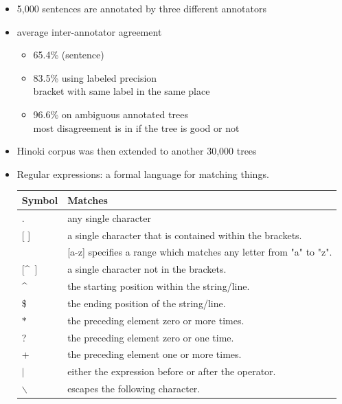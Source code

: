 \documentclass[a4paper,landscape,headrule,footrule,xetex]{foils}
\begin{document}
\begin{itemize}
\item  5,000 sentences are annotated by three different annotators
\item  average inter-annotator agreement
  \begin{itemize}
  \item 65.4\% (sentence)
  \item 83.5\% using labeled precision
    \\ bracket with same label in the same place
  \item 96.6\% on ambiguous annotated trees 
    \\ most disagreement is in if the tree is good or not
  \end{itemize}
\item Hinoki corpus was then extended to another 30,000 trees
\end{itemize}





\begin{itemize}
\item Regular expressions: a formal language for matching things.
\\[2ex]
  \begin{tabular}{ll}
    Symbol & Matches \\ \hline
    . & any single character\\
    {[ ]} & a single character that is contained within the brackets. \\
    & {[a-z]} specifies a range which matches any  letter from "a" to "z".\\
    {[\textasciicircum ~]} & 	a single character not in the brackets. \\
    \textasciicircum 	& the starting position within the string/line. \\
    \$ 	&  the ending position of the string/line. \\
    $*$ &	the preceding element zero or more times. \\
    ? &	 the preceding element zero or one time. \\
    + &	 the preceding element one or more times. \\
    $|$ &  either the expression before or after the operator. \\
    $\backslash$ & escapes the following character. \\
  \end{tabular}

\end{itemize}
\end{document}
